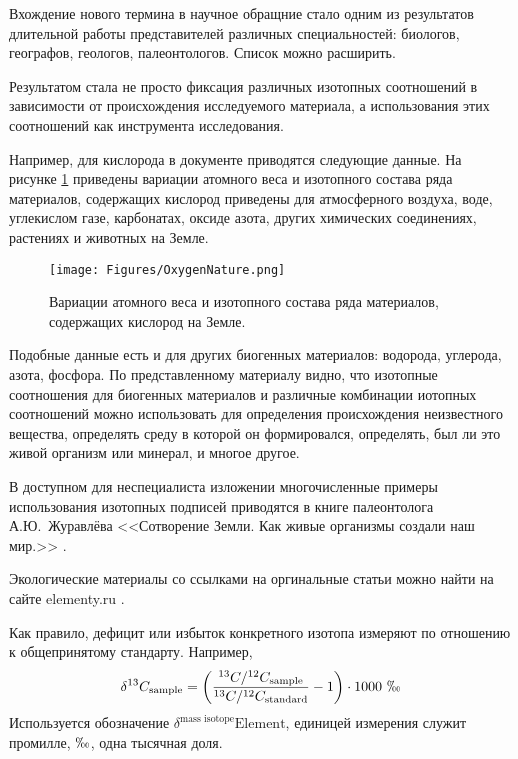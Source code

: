 \documentclass[a5paper,openany]{book}
\begin{document}
Вхождение нового термина в научное обращние стало одним из результатов длительной работы представителей различных специальностей: биологов, географов, геологов, палеонтологов. Список можно расширить.

Результатом стала не просто фиксация различных изотопных соотношений в зависимости от происхождения исследуемого материала, а использования этих соотношений как инструмента исследования.

Например, для кислорода в документе \cite{IUPAC2018} приводятся следующие данные.
На рисунке \ref{f:OxygenNature} приведены вариации атомного веса и изотопного состава ряда материалов, содержащих кислород приведены для атмосферного воздуха, воде, углекислом газе, карбонатах, оксиде азота, других химических соединениях, растениях и животных на Земле. 

\begin{figure}[ht] 
	\centering\small
	\unitlength=1mm
	\texttt{[image: Figures/OxygenNature.png]} 
	\caption{Вариации атомного веса и изотопного состава ряда материалов, содержащих кислород \cite{IUPAC2018} на Земле.} 
	\label{f:OxygenNature}
\end{figure}


Подобные данные есть и для других биогенных материалов: водорода, углерода, азота, фосфора. 
По представленному материалу видно, что изотопные соотношения для биогенных материалов и различные комбинации  иотопных соотношений можно использовать для определения происхождения неизвестного вещества, определять среду в которой он формировался, определять, был ли это живой организм или минерал, и многое другое. 

В доступном для неспециалиста изложении многочисленные примеры использования изотопных подписей приводятся в книге палеонтолога А.Ю.~Журавлёва <<Сотворение Земли. Как живые организмы создали наш мир.>> \cite{Zhuravlev2019}.

Экологические материалы со ссылками на оргинальные статьи можно найти на сайте elementy.ru \cite{OpaevIsotope}.

Как правило, дефицит или избыток конкретного изотопа измеряют по отношению к общепринятому стандарту. Например,
\begin{equation*}
\delta^{13}C_{\text{sample}} = \left( \frac{^{13}C/^{12}C_{\text{sample}}}{^{13}C/^{12}C_{\text{standard}}} - 1\right) \cdot 1000 \ \permil
\end{equation*}
Используется обозначение $\delta^{\text{mass isotope}}\text{Element}$, единицей измерения служит промилле, $\permil$, одна тысячная доля.
\end{document}
